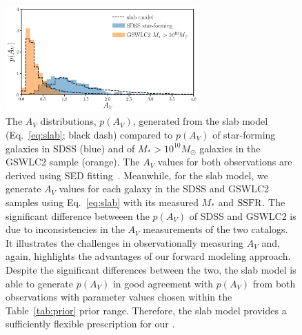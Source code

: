 \begin{figure}
    \begin{center}
        \includegraphics[width=0.66\textwidth]{figs/slab_model.pdf} 
        \caption{\label{fig:av_dist}
        The $A_V$ distributions, $p(A_V)$, generated from the slab model (Eq.~\ref{eq:slab};
        black dash) compared to $p(A_V)$ of star-forming galaxies in SDSS
        (blue) and of $M_* > 10^{10}M_\odot$ galaxies in the \cite{salim2018} GSWLC2 sample (orange). 
        The $A_V$ values for both observations are derived using SED
        fitting~\citep{brinchmann2004, salim2018}. 
        Meanwhile, for the slab model, we generate $A_V$ values for each galaxy
        in the SDSS and GSWLC2 samples using Eq.~\ref{eq:slab} with its
        measured $M_*$ and ${\rm SSFR}$. 
        The significant difference betweeen the $p(A_V)$ of SDSS and GSWLC2 is
        due to inconsistencies in the $A_V$ measurements of the two catalogs. 
        It illustrates the challenges in observationally measuring $A_V$ and,
        again, highlights the advantages of our forward modeling approach. 
        Despite the significant differences between the two, the slab model is
        able to generate $p(A_V)$ in good agreement with $p(A_V)$ from both
        observations with parameter values chosen within the
        Table~\ref{tab:prior} prior range. 
        Therefore, the slab model provides a sufficiently flexible prescription
        for our \eda.
        }
    \end{center}
\end{figure}


